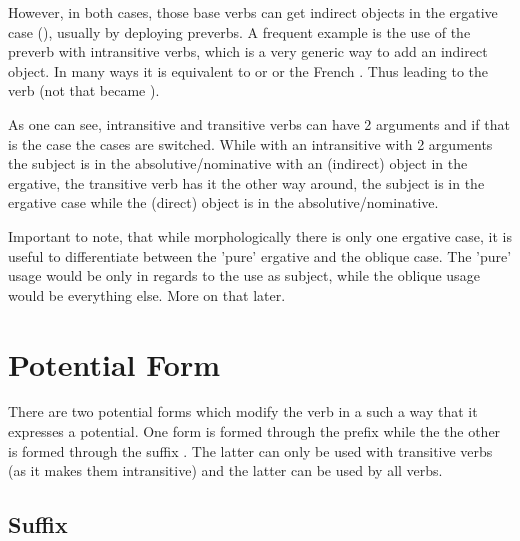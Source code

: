 \documentclass[a4paper, 10pt]{book}
\begin{document}
However, in both cases, those base verbs can get indirect objects in the ergative case (), usually by deploying preverbs. A frequent example is the use of the preverb  with intransitive verbs, which is a very generic way to add an indirect object. In many ways it is equivalent to  or  or the French . Thus leading to the verb  (not that  became ).


\begin{exe}
\ex
\begin{xlist}
    \item {}
    \item {}
\end{xlist}
\end{exe}

As one can see, intransitive and transitive verbs can have 2 arguments and if that is the case the cases are switched. While with an intransitive with 2 arguments the subject is in the absolutive/nominative with an (indirect) object in the ergative, the transitive verb has it the other way around, the subject is in the ergative case while the (direct) object is in the absolutive/nominative. 

Important to note, that while morphologically there is only one ergative case, it is useful to differentiate between the 'pure' ergative and the oblique case. The 'pure' usage would be only in regards to the use as subject, while the oblique usage would be everything else. More on that later.

\section{Potential Form}
There are two potential forms which modify the verb in a such a way that it expresses a potential. One form is formed through the prefix  while the the other is formed through the suffix . The latter can only be used with transitive verbs (as it makes them intransitive) and the latter can be used by all verbs.

\subsection{Suffix {}}
\begin{exe}
    \ex
    \begin{xlist}
    \item {}
    \item {}
    \item {}
\end{xlist}
\end{exe}
\end{document}
